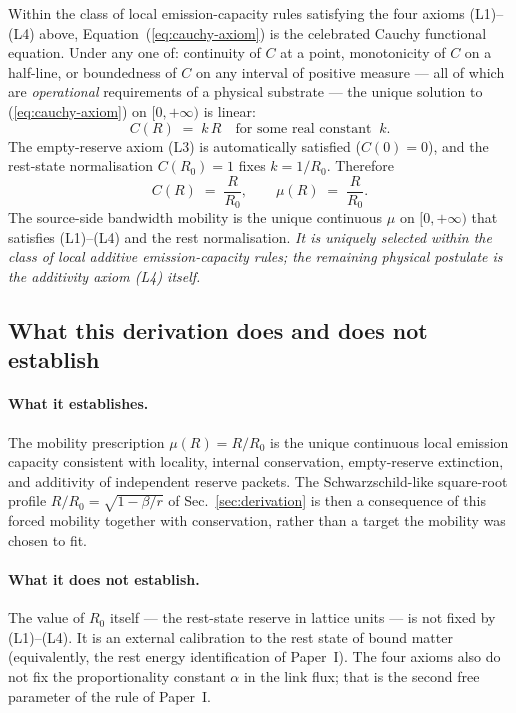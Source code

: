 \documentclass[11pt,a4paper]{article}
\begin{document}
Within the class of local emission-capacity rules satisfying
the four axioms (L1)--(L4) above,
Equation~(\ref{eq:cauchy-axiom}) is the celebrated Cauchy
functional equation. Under any one of: continuity of $C$ at a
point, monotonicity of $C$ on a half-line, or boundedness of
$C$ on any interval of positive measure --- all of which are
\emph{operational} requirements of a physical substrate --- the
unique solution to (\ref{eq:cauchy-axiom}) on $[0, +\infty)$ is
linear:
\begin{equation}
C(R) \;=\; k \, R
\quad\text{for some real constant}\;\; k.
\label{eq:cauchy-soln}
\end{equation}
The empty-reserve axiom (L3) is automatically satisfied
($C(0) = 0$), and the rest-state normalisation $C(R_0) = 1$
fixes $k = 1/R_0$. Therefore
\begin{equation}
\boxed{\;
C(R) \;=\; \frac{R}{R_0}, \qquad
\mu(R) \;=\; \frac{R}{R_0}.
\;}
\label{eq:mu-derived}
\end{equation}
The source-side bandwidth mobility is the unique continuous
$\mu$ on $[0,+\infty)$ that satisfies (L1)--(L4) and the rest
normalisation. \emph{It is uniquely selected within
the class of local additive emission-capacity rules; the
remaining physical postulate is the additivity axiom (L4)
itself.}

\subsection{What this derivation does and does not establish}

\paragraph{What it establishes.} The mobility prescription
$\mu(R) = R/R_0$ is the unique continuous local emission capacity
consistent with locality, internal conservation, empty-reserve
extinction, and additivity of independent reserve packets. The
Schwarzschild-like square-root profile $R/R_0 = \sqrt{1-\beta/r}$
of Sec.~\ref{sec:derivation} is then a consequence of this
forced mobility together with conservation, rather than a target
the mobility was chosen to fit.

\paragraph{What it does not establish.} The value of $R_0$
itself --- the rest-state reserve in lattice units --- is not
fixed by (L1)--(L4). It is an external calibration to the rest
state of bound matter (equivalently, the rest energy
identification of Paper~I). The four axioms also do not fix
the proportionality constant $\alpha$ in the link flux; that
is the second free parameter of the rule of Paper~I.
\end{document}
